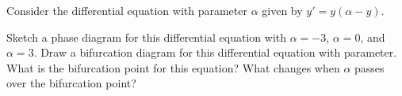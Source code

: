 \begin{exercise}
Consider the differential equation with parameter $\alpha$ given by $y' = y(\alpha - y)$. 
\begin{tasks}
\task Sketch a phase diagram for this differential equation with $\alpha = -3$, $\alpha = 0$, and $\alpha = 3$. 
\task Draw a bifurcation diagram for this differential equation with parameter. 
\task What is the bifurcation point for this equation? What changes when $\alpha$ passes over the bifurcation point?
\end{tasks}
\end{exercise}

\setcounter{exercise}{100}
